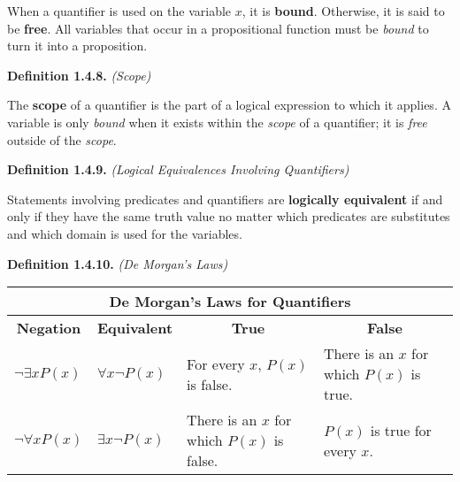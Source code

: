 \documentclass[12pt, letterpaper]{article}
\begin{document}
When a quantifier is used on the variable $ x $, it is \textbf{bound}. Otherwise, it is said to be \textbf{free}. All variables that occur in a propositional function must be \textit{bound} to turn it into a proposition.

\bigskip
\bigskip

\textbf{Definition 1.4.8.} \textit{(Scope)}
\medskip

The \textbf{scope} of a quantifier is the part of a logical expression to which it applies. A variable is only \textit{bound} when it exists within the \textit{scope} of a quantifier; it is \textit{free} outside of the \textit{scope}.

\bigskip
\bigskip

\textbf{Definition 1.4.9.} \textit{(Logical Equivalences Involving Quantifiers)}
\medskip

Statements involving predicates and quantifiers are \textbf{logically equivalent} if and only if they have the same truth value no matter which predicates are substitutes and which domain is used for the variables.

\bigskip
\bigskip

\textbf{Definition 1.4.10.} \textit{(De Morgan's Laws)}
\medskip

\medskip
\begin{center}
\begin{tabular}{|llllll|}
\hline
\multicolumn{6}{|c|}{\textbf{De Morgan's Laws for Quantifiers}}                                                                          \\ \hline
    \multicolumn{1}{|c|}{\textbf{Negation}} & \multicolumn{1}{c|}{\textbf{Equivalent}} & \multicolumn{2}{c|}{\textbf{True}} & \multicolumn{2}{c|}{\textbf{False}} \\ \hline
    \multicolumn{1}{|p{3em}|}{$ \neg \exists x P(x) $} & \multicolumn{1}{p{3em}|}{$ \forall x \neg P(x)  $} & \multicolumn{2}{p{5cm}|}{ For every $ x $, $ P(x) $ is false. } & \multicolumn{2}{p{5cm}|}{There is an $ x $ for which $ P(x) $ is true.}               \\ \hline
    \multicolumn{1}{|p{3em}|}{$ \neg \forall x P(x) $} & \multicolumn{1}{p{3em}|}{$ \exists x \neg P(x)  $} & \multicolumn{2}{p{5cm}|}{ There is an $ x $ for which $ P(x) $ is false. } & \multicolumn{2}{p{5cm}|}{$ P(x) $ is true for every $ x $. }               \\ \hline
\end{tabular}
\end{center}
\medskip
\end{document}
